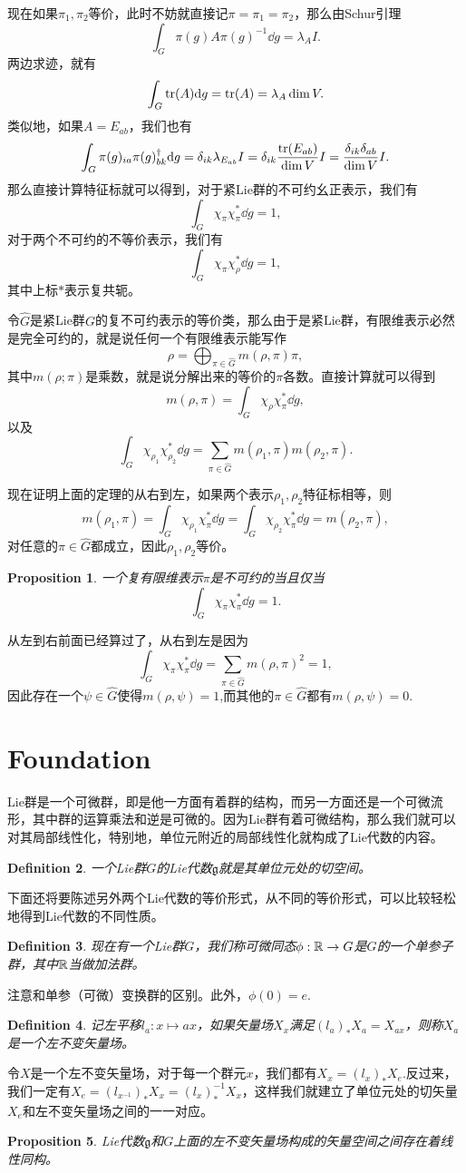 \documentclass[9pt]{extbook}
\theoremstyle{plain}
\newtheorem{defi}{Definition}
\newtheorem{pro}[defi]{Proposition}
\newcommand{\lag}{{\mathfrak{g}}}  %
\begin{document}
现在如果$\pi_1,\pi_2$等价，此时不妨就直接记$\pi=\pi_1=\pi_2$，那么由Schur引理
\[
	\int_G \pi(g)A\pi(g)^{-1}\dd g=\lambda_A I.
\]
两边求迹，就有
\[
	\int_G \operatorname{tr}(A)\mathrm{d} g=\operatorname{tr}(A)=\lambda_A \dim V.
\]
类似地，如果$A=E_{ab}$，我们也有
\[
	\int_G \pi(g)_{ia}\pi(g)^{\dag}_{bk}\mathrm{d} g=\delta_{ik}\lambda_{E_{ab}} I=\delta_{ik}\frac{\operatorname{tr}(E_{ab})}{\dim V}I=\frac{\delta_{ik}\delta_{ab}}{\dim V}I.
\]
那么直接计算特征标就可以得到，对于紧Lie群的不可约幺正表示，我们有
\[
	\int_G \chi_\pi \chi_\pi^*\dd g=1,
\]
对于两个不可约的不等价表示，我们有
\[
	\int_G \chi_\pi \chi_\rho^*\dd g=1,
\]
其中上标$*$表示复共轭。

令$\hat{G}$是紧Lie群$G$的复不可约表示的等价类，那么由于是紧Lie群，有限维表示必然是完全可约的，就是说任何一个有限维表示能写作
\[
	\rho=\bigoplus_{\pi\in\hat{G}}m(\rho,\pi)\pi,
\]
其中$m(\rho;\pi)$是乘数，就是说分解出来的等价的$\pi$各数。直接计算就可以得到
\[
	m(\rho,\pi)=\int_G \chi_\rho \chi_\pi^*\dd g,
\]
以及
\[
	\int_G \chi_{\rho_1} \chi_{\rho_2}^*\dd g=\sum_{\pi\in\hat{G}}m(\rho_1,\pi)m(\rho_2,\pi).
\]

现在证明上面的定理的从右到左，如果两个表示$\rho_1,\rho_2$特征标相等，则
\[
	m(\rho_1,\pi)=\int_G \chi_{\rho_1} \chi_\pi^*\dd g=\int_G \chi_{\rho_2} \chi_\pi^*\dd g=m(\rho_2,\pi),
\]
对任意的$\pi\in\hat{G}$都成立，因此$\rho_1,\rho_2$等价。

\begin{pro}
一个复有限维表示$\pi$是不可约的当且仅当
\[
	\int_G \chi_{\pi} \chi_{\pi}^*\dd g=1.
\]
\end{pro}
从左到右前面已经算过了，从右到左是因为
\[
	\int_G \chi_{\pi} \chi_{\pi}^*\dd g=\sum_{\pi\in\hat{G}}m(\rho,\pi)^2=1,
\]
因此存在一个$\psi\in\hat{G}$使得$m(\rho,\psi)=1$,而其他的$\pi\in\hat{G}$都有$m(\rho,\psi)=0$.

\section{Foundation}
Lie群是一个可微群，即是他一方面有着群的结构，而另一方面还是一个可微流形，其中群的运算乘法和逆是可微的。因为Lie群有着可微结构，那么我们就可以对其局部线性化，特别地，单位元附近的局部线性化就构成了Lie代数的内容。

\begin{defi}
一个Lie群$G$的Lie代数$\lag$就是其单位元处的切空间。
\end{defi}
下面还将要陈述另外两个Lie代数的等价形式，从不同的等价形式，可以比较轻松地得到Lie代数的不同性质。
\begin{defi}
现在有一个Lie群$G$，我们称可微同态$\phi:\mathbb{R}\to G$是$G$的一个单参子群，其中$\mathbb{R}$当做加法群。
\end{defi}
注意和单参（可微）变换群的区别。此外，$\phi(0)=e$.
\begin{defi}记左平移$l_a:x\mapsto ax$，如果矢量场$X_x$满足$(l_a)_*X_a=X_{ax}$，则称$X_a$是一个左不变矢量场。
\end{defi}
令$X$是一个左不变矢量场，对于每一个群元$x$，我们都有$X_x=(l_x)_*X_e$.反过来，我们一定有$X_e=(l_{x^{-1}})_*X_x=(l_x)^{-1}_*X_x$，这样我们就建立了单位元处的切矢量$X_e$和左不变矢量场之间的一一对应。
\begin{pro}
Lie代数$\lag$和$G$上面的左不变矢量场构成的矢量空间之间存在着线性同构。
\end{pro}
\end{document}
